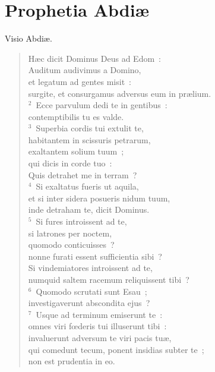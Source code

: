 {\centering \section*{Prophetia Abdiæ}}\thispagestyle{empty}

\noindent Visio Abdi\ae . \begin{flushleft}\begin{verse}\vspace{6pt}H\ae c dicit Dominus Deus ad Edom~:\\ Auditum audivimus a Domino,\\ et legatum ad gentes misit~:\\ surgite, et consurgamus adversus eum in pr\ae lium.\\
${}^{2}$~Ecce parvulum dedi te in gentibus~:\\ contemptibilis tu es valde.\\
${}^{3}$~Superbia cordis tui extulit te,\\ habitantem in scissuris petrarum,\\ exaltantem solium tuum~;\\ qui dicis in corde tuo~:\\ Quis detrahet me in terram~?\\
${}^{4}$~Si exaltatus fueris ut aquila,\\ et si inter sidera posueris nidum tuum,\\ inde detraham te, dicit Dominus.\\
${}^{5}$~Si fures introissent ad te,\\ si latrones per noctem,\\ quomodo conticuisses~?\\ nonne furati essent sufficientia sibi~?\\ Si vindemiatores introissent ad te,\\ numquid saltem racemum reliquissent tibi~?\\
${}^{6}$~Quomodo scrutati sunt Esau~;\\ investigaverunt abscondita ejus~?\\
${}^{7}$~Usque ad terminum emiserunt te~:\\ omnes viri fœderis tui illuserunt tibi~:\\ invaluerunt adversum te viri pacis tu\ae ,\\ qui comedunt tecum, ponent insidias subter te~;\\ non est prudentia in eo.\\

\end{verse}
\end{flushleft}
